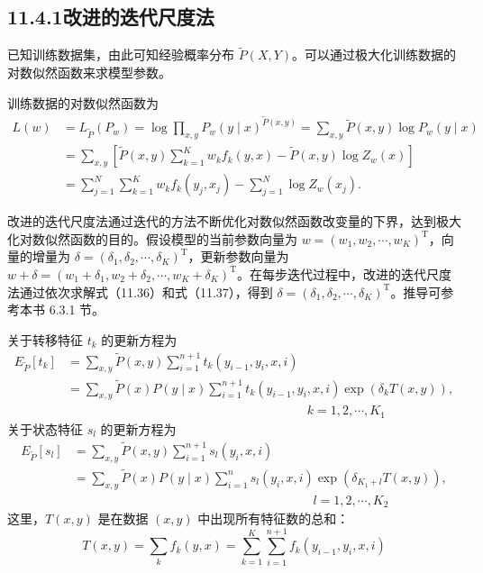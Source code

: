 \documentclass[UTF8, 12pt, fontset=fandol, oneside]{ctexart}
\begin{document}
\subsection*{11.4.1\quad 改进的迭代尺度法}

已知训练数据集，由此可知经验概率分布 $\tilde P(X,Y)$。可以通过极大化训练数据的对数似然函数来求模型参数。

训练数据的对数似然函数为
\[
\begin{aligned}
L(w)&=L_{\tilde P}(P_w)=\log\prod_{x,y}P_w(y\mid x)^{\tilde P(x,y)}
=\sum_{x,y}\tilde P(x,y)\log P_w(y\mid x)\\
&=\sum_{x,y}\left[\tilde P(x,y)\sum_{k=1}^{K}w_k f_k(y,x)-\tilde P(x,y)\log Z_w(x)\right]\\
&=\sum_{j=1}^{N}\sum_{k=1}^{K}w_k f_k(y_j,x_j)-\sum_{j=1}^{N}\log Z_w(x_j).
\end{aligned}
\]

改进的迭代尺度法通过迭代的方法不断优化对数似然函数改变量的下界，达到极大化对数似然函数的目的。假设模型的当前参数向量为 $w=(w_1,w_2,\cdots,w_K)^{\mathrm T}$，向量的增量为 $\delta=(\delta_1,\delta_2,\cdots,\delta_K)^{\mathrm T}$，更新参数向量为 $w+\delta=(w_1+\delta_1,w_2+\delta_2,\cdots,w_K+\delta_K)^{\mathrm T}$。在每步迭代过程中，改进的迭代尺度法通过依次求解式（11.36）和式（11.37），得到 $\delta=(\delta_1,\delta_2,\cdots,\delta_K)^{\mathrm T}$。推导可参考本书 6.3.1 节。

关于转移特征 $t_k$ 的更新方程为
\begin{equation}
\begin{aligned}
E_{\tilde P}[t_k]
&=\sum_{x,y}\tilde P(x,y)\sum_{i=1}^{n+1}t_k(y_{i-1},y_i,x,i)\\
&=\sum_{x,y}\tilde P(x)P(y\mid x)\sum_{i=1}^{n+1}t_k(y_{i-1},y_i,x,i)\exp(\delta_k T(x,y)),\\
&\hspace{8cm} k=1,2,\cdots,K_1
\end{aligned}
\tag{11.36}
\end{equation}
关于状态特征 $s_l$ 的更新方程为
\begin{equation}
\begin{aligned}
E_{\tilde P}[s_l]
&=\sum_{x,y}\tilde P(x,y)\sum_{i=1}^{n+1}s_l(y_i,x,i)\\
&=\sum_{x,y}\tilde P(x)P(y\mid x)\sum_{i=1}^{n}s_l(y_i,x,i)\exp(\delta_{K_1+l}T(x,y)),\\
&\hspace{8cm} l=1,2,\cdots,K_2
\end{aligned}
\tag{11.37}
\end{equation}
这里，$T(x,y)$ 是在数据 $(x,y)$ 中出现所有特征数的总和：
\begin{equation}
T(x,y)=\sum_k f_k(y,x)=\sum_{k=1}^{K}\sum_{i=1}^{n+1}f_k(y_{i-1},y_i,x,i)
\tag{11.38}
\end{equation}
\end{document}
